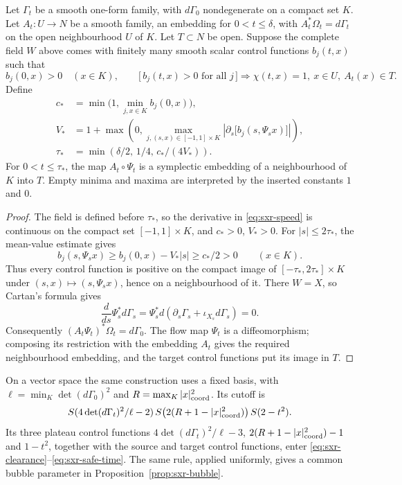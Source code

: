 \begin{lemma}\label{lem:sxr-exact}
Let $\Gamma_t$ be a smooth one-form family, with $d\Gamma_0$ nondegenerate on a compact set $K$.
Let $A_t:U\to N$ be a smooth family, an embedding for $0<t\le\delta$, with $A_t^*\Omega_t=d\Gamma_t$
on the open neighbourhood $U$ of $K$. Let $T\subset N$ be open. Suppose the complete field $W$
above comes with finitely many smooth scalar control functions $b_j(t,x)$ such that
\[
 b_j(0,x)>0\quad(x\in K),\qquad
 \bigl[\,b_j(t,x)>0\text{ for all }j\,\bigr]
 \Longrightarrow \chi(t,x)=1,\ x\in U,\ A_t(x)\in T.
\]
Define
\begin{align}
 c_*&=\min\bigl(1,\min_{j,x\in K} b_j(0,x)\bigr),\label{eq:sxr-clearance}\\
 V_*&=1+\max\left(0,\max_{j,(s,x)\in[-1,1]\times K}
   \left|\partial_s\bigl[b_j(s,\Psi_sx)\bigr]\right|\right),\label{eq:sxr-speed}\\
 \tau_*&=\min\left(\delta/2,\,1/4,\,c_*/(4V_*)\right).\label{eq:sxr-safe-time}
\end{align}
For $0<t\le\tau_*$, the map $A_t\circ\Psi_t$ is a symplectic embedding of a neighbourhood of $K$
into $T$. Empty minima and maxima are interpreted by the inserted constants $1$ and $0$.
\end{lemma}

\begin{proof}
The field is defined before $\tau_*$, so the derivative in \eqref{eq:sxr-speed} is continuous on
the compact set $[-1,1]\times K$, and $c_*>0$, $V_*>0$. For $|s|\le2\tau_*$, the mean-value estimate gives
\[
 b_j(s,\Psi_sx)\ge b_j(0,x)-V_*|s|\ge c_*/2>0
 \qquad(x\in K).
\]
Thus every control function is positive on the compact image of $[-\tau_*,2\tau_*]\times K$ under
$(s,x)\mapsto(s,\Psi_sx)$, hence on a neighbourhood of it. There $W=X$, so Cartan's formula gives
\[
 \frac d{ds}\Psi_s^*d\Gamma_s
 =\Psi_s^*d(\partial_s\Gamma_s+\iota_{X_s}d\Gamma_s)=0.
\]
Consequently $(A_t\Psi_t)^*\Omega_t=d\Gamma_0$. The flow map $\Psi_t$ is a diffeomorphism;
composing its restriction with the embedding $A_t$ gives the required neighbourhood embedding,
and the target control functions put its image in $T$.
\end{proof}

On a vector space the same construction uses a fixed basis, with $\ell=\min_K\det(d\Gamma_0)^2$
and $R=\max_K |x|_{\rm coord}^2$. Its cutoff is
\[
 S(4\det(d\Gamma_t)^2/\ell-2)\,
 S\bigl(2(R+1-|x|_{\rm coord}^2)\bigr)\,S(2-t^2).
\]
Its three plateau control functions $4\det(d\Gamma_t)^2/\ell-3$, $2(R+1-|x|_{\rm coord}^2)-1$
and $1-t^2$, together with the source and target control functions, enter
\eqref{eq:sxr-clearance}--\eqref{eq:sxr-safe-time}.
The same rule, applied uniformly, gives a common bubble parameter in Proposition~\ref{prop:sxr-bubble}.


